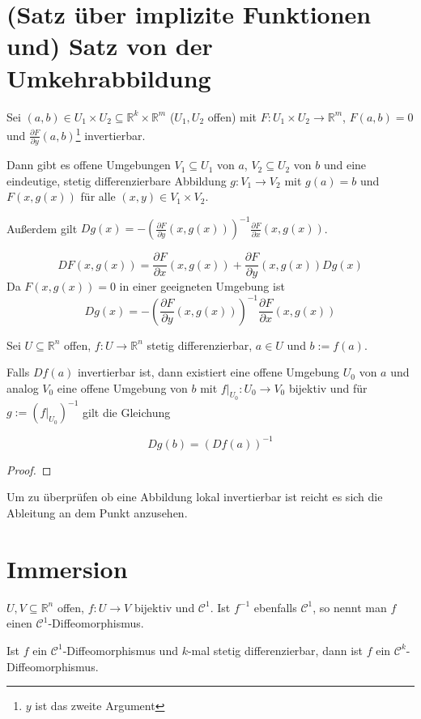 \section{(Satz \"uber implizite Funktionen und) Satz von der Umkehrabbildung}
\begin{theorem}
	Sei $(a,b) \in U_1 \times U_2 \subseteq \mathbb R^k \times \mathbb R^m$ ($U_1, U_2$ offen) mit $F: U_1 \times U_2 \rightarrow \mathbb R^m$, $F(a,b) = 0$ und $\frac{\partial F}{\partial y}(a,b)$\footnote{$y$ ist das zweite Argument} invertierbar.
	
	Dann gibt es offene Umgebungen $V_1\subseteq U_1$ von $a$, $V_2\subseteq U_2$ von $b$ und eine eindeutige, stetig differenzierbare Abbildung $g:V_1 \rightarrow V_2$ mit $g(a)=b$ und $F(x,g(x))$ f\"ur alle $(x,y)\in V_1\times V_2$.
	
	Au\ss erdem gilt $Dg(x) = -\left(\frac{\partial F}{\partial y}(x,g(x)) \right)^{-1}\frac{\partial F}{\partial x}(x,g(x))$.
\end{theorem}
\begin{remark}[Merkhilfe]
	$$DF(x,g(x)) = \frac{\partial F}{\partial x}(x,g(x)) + \frac{\partial F}{\partial y}(x,g(x)) Dg(x)$$
	Da $F(x,g(x))=0$ in einer geeigneten Umgebung ist $$Dg(x)=-\left(\frac{\partial F}{\partial y}(x,g(x)) \right)^{-1}\frac{\partial F}{\partial x}(x,g(x))$$
\end{remark}

\begin{theorem}
	Sei $U \subseteq \mathbb R^n$ offen, $f: U \rightarrow \mathbb R^n$ stetig differenzierbar, $a\in U$ und $b:=f(a)$.
	
	Falls $Df(a)$ invertierbar ist, dann existiert eine offene Umgebung $U_0$ von $a$ und analog $V_0$ eine offene Umgebung von $b$ mit $f|_{U_0}: U_0 \rightarrow V_0$ bijektiv und f\"ur $g:=\left(f|_{U_0} \right)^{-1}$ gilt die Gleichung
	
	$$Dg(b)=(Df(a))^{-1}$$
\end{theorem}
\begin{proof}
\end{proof}
\begin{remark}
	Um zu \"uberpr\"ufen ob eine Abbildung lokal invertierbar ist reicht es sich die Ableitung an dem Punkt anzusehen.
\end{remark}




\section{Immersion}
\begin{definition}[Diffeomorphismus]
	$U, V\subseteq \mathbb R^n$ offen, $f:U \rightarrow V$ bijektiv und $\mathcal C^1$. Ist $f^{-1}$ ebenfalls $\mathcal C^1$, so nennt man $f$ einen $\mathcal C^1$-Diffeomorphismus.
\end{definition}
\begin{lemma}
	Ist $f$ ein $\mathcal C^1$-Diffeomorphismus und $k$-mal stetig differenzierbar, dann ist $f$ ein $\mathcal C^k$-Diffeomorphismus.
\end{lemma}

